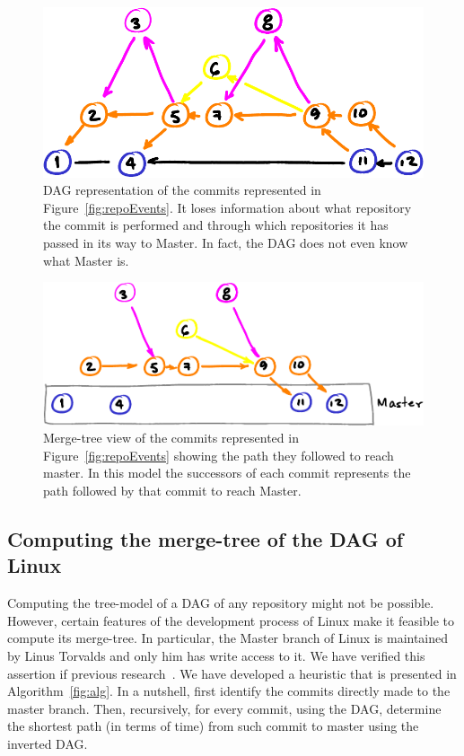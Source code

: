 \documentclass[conference, draftclsnofoot, draft]{IEEEtran}
\begin{document}
\begin{figure}[htbp]
        \centering
        \includegraphics[width=.8\columnwidth]{figures/dag.pdf}
        \caption{DAG representation of the commits represented in Figure~\ref{fig:repoEvents}. It loses information about what repository the commit is performed and
                through which repositories it has passed in its way to Master. In fact, the DAG does not even know what Master is.}
        \label{fig:repoDAG}
\end{figure}

\begin{figure}[htbp]
        \centering
        \includegraphics[width=\columnwidth]{figures/tree.pdf}
        \caption{Merge-tree view of the commits  represented in Figure~\ref{fig:repoEvents} showing the path they followed to reach master. In this model the successors of
                each commit represents the path followed by that commit to reach Master.}
        \label{fig:repoTree}
\end{figure}


\subsection{Computing the merge-tree of the DAG of Linux}

Computing the tree-model of a DAG of any repository might not be possible. However, certain features of the development process of Linux make it feasible to
compute its merge-tree. In particular, the Master branch of Linux is maintained by Linus Torvalds and only him has write access to it. We have verified this
assertion if previous research~\cite{German2015}. We have developed a heuristic that is presented in Algorithm~\ref{fig:alg}. In a nutshell, first identify the commits directly made
to the master branch. Then,
recursively, for
every commit, using the DAG, determine the shortest path (in terms of time) from such commit to master using the inverted DAG.
\end{document}

